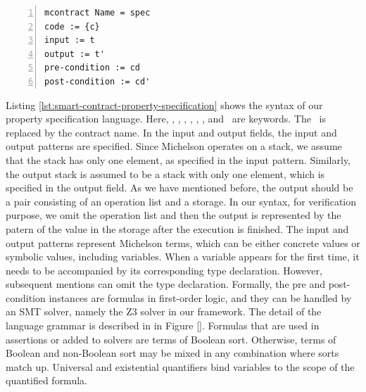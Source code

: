 \documentclass[a4paper,UKenglish,cleveref, autoref, thm-restate]{lipics-v2021}
\begin{document}
\begin{lstlisting}[float,captionpos=b,caption={Smart contract property specification},label={lst:smart-contract-property-specification},numbers=left]
mcontract Name = spec
code := {c}
input := t
output := t'
pre-condition := cd
post-condition := cd'
\end{lstlisting}
Listing \ref{lst:smart-contract-property-specification} shows the syntax of our property specification language. Here, \KMCONTRACT, \KWITH, \KCODE, \KINPUT, \KOUTPUT, \KPRECONDI, and \KPOSTCONDI\ are keywords. The \KNAME\ is replaced by the contract name. In the input and output fields, the input and output patterns are specified. Since Michelson operates on a stack, we assume that the stack has only one element, as specified in the input pattern. Similarly, the output stack is assumed to be a stack with only one element, which is specified in the output field. As we have mentioned before, the output should be a pair consisting of an operation list and a storage. In our syntax, for verification purpose, we omit the operation list and then the output is represented by the patern of the value in the storage after the execution is finished. The input and output patterns represent Michelson terms, which can be either concrete values or symbolic values, including variables. When a variable appears for the first time, it needs to be accompanied by its corresponding type declaration. However, subsequent mentions can omit the type declaration. Formally, the pre and post-condition instances are formulas in first-order logic, and they can be handled by an SMT solver, namely the Z3 solver in our framework. The detail of the language grammar is described in in Figure \ref{}. Formulas that are used in assertions or added to solvers are terms of Boolean sort. Otherwise, terms of Boolean and non-Boolean sort may be mixed in any combination where sorts match up. Universal and existential quantifiers bind variables to the scope of the quantified formula.
\end{document}
